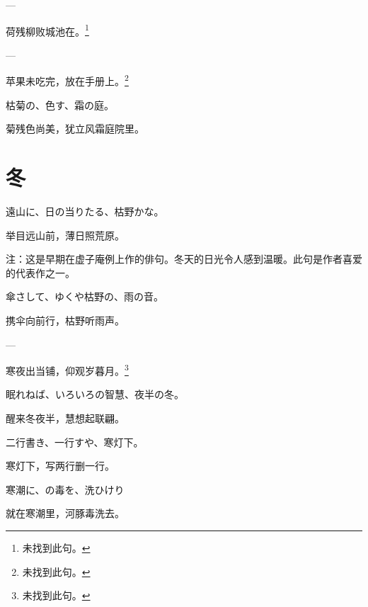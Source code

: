 \begin{haiku}
    {\FH ---}

    {\FK 荷残柳败城池在。\footnote{\FT 未找到此句。}}
\end{haiku}

\begin{haiku}
    {\FH ---}

    {\FK 苹果未吃完，放在手册上。\footnote{\FT 未找到此句。}}
\end{haiku}

\begin{haiku}
    {\FH 枯菊の、色す、霜の庭。}

    {\FK 菊残色尚美，犹立风霜庭院里。}
\end{haiku}

\section{\FK 冬}

\setcounter{haikucounter}{0}

\begin{haiku}
    {\FH 遠山に、日の当りたる、枯野かな。}

    {\FK 举目远山前，薄日照荒原。}

    {\FT 注：这是早期在虚子庵例上作的俳句。冬天的日光令人感到温暖。此句是作者喜爱的代表作之一。}
\end{haiku}

\begin{haiku}
    {\FH 傘さして、ゆくや枯野の、雨の音。}

    {\FK 携伞向前行，枯野听雨声。}
\end{haiku}

\begin{haiku}
    {\FH ---}

    {\FK 寒夜出当铺，仰观岁暮月。\footnote{\FT 未找到此句。}}
\end{haiku}

\begin{haiku}
    {\FH 眠れねば、いろいろの智慧、夜半の冬。}

    {\FK 醒来冬夜半，慧想起联翩。}
\end{haiku}

\begin{haiku}
    {\FH 二行書き、一行すや、寒灯下。}

    {\FK 寒灯下，写两行删一行。}
\end{haiku}

\begin{haiku}
    {\FH 寒潮に、の毒を、洗ひけり}

    {\FK 就在寒潮里，河豚毒洗去。}
\end{haiku}

